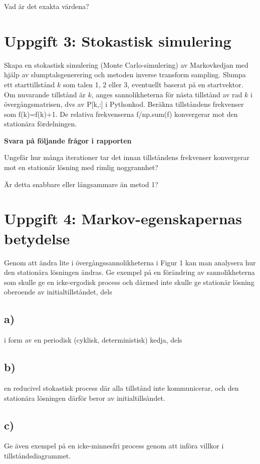 \documentclass[a4paper]{article}
\begin{document}
Vad är det exakta värdena?


\section{Uppgift 3: Stokastisk simulering}
Skapa en stokastisk simulering (Monte Carlo-simulering) av Markovkedjan med hjälp av
slumptalsgenerering och metoden inverse transform sampling. Slumpa ett starttillstånd \( k \) som
talen 1, 2 eller 3, eventuellt baserat på en startvektor. Om nuvarande tillstånd är \( k \), anges
sannolikheterna för nästa tillstånd av rad \( k \) i övergångsmatrisen, dvs av P[k,:] i Pythonkod.
Beräkna tillståndens frekvenser som f(k)=f(k)+1. De relativa frekvenserna f/np.sum(f)
konvergerar mot den stationära fördelningen.


\textbf{Svara på följande frågor i rapporten}

Ungefär hur många iterationer tar det innan
tillståndens frekvenser konvergerar mot en stationär lösning med rimlig noggrannhet?

Är detta snabbare eller långsammare än metod 1?


\section{Uppgift 4: Markov-egenskapernas betydelse}
Genom att ändra lite i övergångssannolikheterna i Figur 1 kan man analysera hur den
stationära lösningen ändras. Ge exempel på en förändring av sannolikheterna som skulle ge
en icke-ergodisk process och därmed inte skulle ge stationär lösning oberoende av
initialtillståndet, dels

\subsection{a)}
i form av en periodisk (cyklisk, deterministisk) kedja, dels

\subsection{b)}
en reducivel stokastisk process där alla tillstånd inte kommunicerar, och den stationära
lösningen därför beror av initialtillsåndet.

\subsection{c)}
Ge även exempel på en icke-minnesfri process genom att införa villkor i tillståndsdiagrammet.
\end{document}
